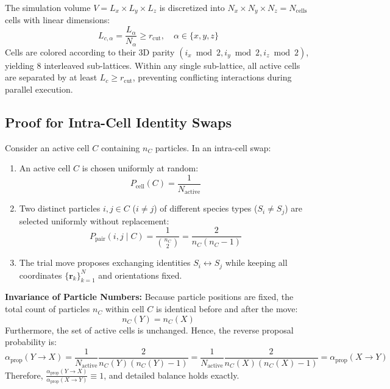 \documentclass[11pt,a4paper]{article}
\begin{document}
The simulation volume $V = L_x \times L_y \times L_z$ is discretized into $N_x \times N_y \times N_z = N_{\text{cells}}$ cells with linear dimensions:
\begin{equation}
    L_{c, \alpha} = \frac{L_\alpha}{N_\alpha} \ge r_{\text{cut}}, \quad \alpha \in \{x, y, z\}
\end{equation}
Cells are colored according to their 3D parity $(i_x \bmod 2, i_y \bmod 2, i_z \bmod 2)$, yielding 8 interleaved sub-lattices. Within any single sub-lattice, all active cells are separated by at least $L_c \ge r_{\text{cut}}$, preventing conflicting interactions during parallel execution.

\subsection{Proof for Intra-Cell Identity Swaps}

Consider an active cell $C$ containing $n_C$ particles. In an intra-cell swap:
\begin{enumerate}
    \item An active cell $C$ is chosen uniformly at random:
    \begin{equation}
        P_{\text{cell}}(C) = \frac{1}{N_{\text{active}}}
    \end{equation}
    \item Two distinct particles $i, j \in C$ ($i \neq j$) of different species types ($S_i \neq S_j$) are selected uniformly without replacement:
    \begin{equation}
        P_{\text{pair}}(i, j \mid C) = \frac{1}{\binom{n_C}{2}} = \frac{2}{n_C (n_C - 1)}
    \end{equation}
    \item The trial move proposes exchanging identities $S_i \leftrightarrow S_j$ while keeping all coordinates $\{\mathbf{r}_k\}_{k=1}^N$ and orientations fixed.
\end{enumerate}

\textbf{Invariance of Particle Numbers:} Because particle positions are fixed, the total count of particles $n_C$ within cell $C$ is identical before and after the move:
\begin{equation}
    n_C(Y) = n_C(X)
\end{equation}
Furthermore, the set of active cells is unchanged. Hence, the reverse proposal probability is:
\begin{equation}
    \alpha_{\text{prop}}(Y \to X) = \frac{1}{N_{\text{active}}} \frac{2}{n_C(Y) (n_C(Y) - 1)} = \frac{1}{N_{\text{active}}} \frac{2}{n_C(X) (n_C(X) - 1)} = \alpha_{\text{prop}}(X \to Y)
\end{equation}
Therefore, $\frac{\alpha_{\text{prop}}(Y \to X)}{\alpha_{\text{prop}}(X \to Y)} \equiv 1$, and detailed balance holds exactly.
\end{document}
